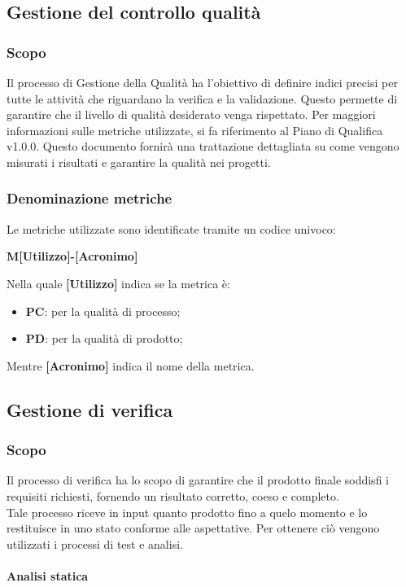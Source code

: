 \subsection{Gestione del controllo qualità}
\subsubsection{Scopo}
Il processo di Gestione della Qualità ha l'obiettivo di definire indici
precisi per tutte le attività che riguardano la verifica e la validazione.
Questo permette di garantire che il livello di qualità desiderato venga
rispettato. Per maggiori informazioni sulle metriche utilizzate,
si fa riferimento al Piano di Qualifica v1.0.0.
Questo documento fornirà una trattazione dettagliata su come
vengono misurati i risultati e garantire la qualità nei progetti.
\subsubsection{Denominazione metriche}
Le metriche utilizzate sono identificate tramite un codice univoco:
\begin{center}
    \textbf{M[Utilizzo]-[Acronimo]}
\end{center}
Nella quale \textbf{[Utilizzo]} indica se la metrica è:
\begin{itemize}
    \item \textbf{PC}: per la qualità di processo;
    \item \textbf{PD}:  per la qualità di prodotto;
\end{itemize}
Mentre \textbf{[Acronimo]} indica il nome della metrica.
\subsection{Gestione di verifica}
\subsubsection{Scopo} 
Il processo di verifica ha lo scopo di garantire che il prodotto finale soddisfi i requisiti richiesti, fornendo un risultato corretto, coeso e completo.\\
Tale processo riceve in input quanto prodotto fino a quelo momento e lo restituisce in uno stato conforme alle aspettative.
Per ottenere ciò vengono utilizzati i processi di test e analisi.
\paragraph{Analisi statica} ~

